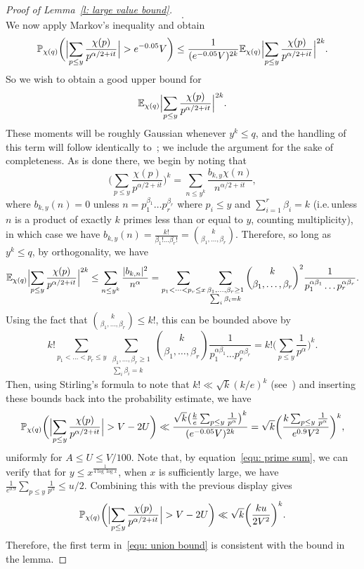 \documentclass[a4paper,12pt,reqno]{amsart}
\newcommand{\E}{\mathbb{E}}
\newcommand{\p}{\mathbb{P}}
\begin{document}
\begin{proof}[Proof of Lemma~\ref{l: large value bound}]
\[. \]
We now apply Markov's inequality and obtain
\[
\p_{\chi(q)} \biggl( \Bigl| \sum_{p \leq y} \frac{\chi (p)}{p^{\alpha / 2 + it}} \Bigr| > e^{-0.05} V \biggr) \leq \frac{1}{(e^{-0.05} V)^{2k}}\E_{\chi (q)} \Bigl| \sum_{p \leq y} \frac{\chi (p)}{p^{\alpha / 2 + it}} \Bigr|^{2k} .
\]
So we wish to obtain a good upper bound for 
\[
\E_{\chi (q)} \Bigl| \sum_{p \leq y} \frac{\chi (p)}{p^{\alpha / 2 + it}} \Bigr|^{2k}.
\]
These moments will be roughly Gaussian whenever $y^k \leq q$, and the handling of this term will follow identically to~\citet[Lemma~3]{SoundMoments}; we include the argument for the sake of completeness. As is done there, we begin by noting that 
\[
\biggl( \sum_{p \leq y} \frac{\chi (p)}{p^{\alpha / 2 + it}} \biggr)^{k} = \sum_{n \leq y^k} \frac{b_{k,y} \chi(n)}{n^{\alpha/2 + it}},
\]
where $b_{k,y} (n) = 0$ unless $n = p_1^{\beta_1} \dots p_r^{\beta_r}$ where $p_i \leq y$ and $\sum_{i=1}^r \beta_i = k$ (i.e.\,unless $n$ is a product of exactly $k$ primes less than or equal to $y$, counting multiplicity), in which case we have $b_{k,y} (n) = \frac{k!}{\beta_1! \dots \beta_r!} = {{k}\choose{\beta_1 , \dots, \beta_r}}$. Therefore, so long as $y^k \leq q$, by orthogonality, we have
\[
\E_{\chi (q)} \Bigl| \sum_{p \leq y} \frac{\chi (p)}{p^{\alpha / 2 + it}} \Bigr|^{2k} \leq \sum_{n \leq y^k} \frac{|b_{k,n}|^2}{n^{\alpha}} = \sum_{p_1 < \dots < p_r \leq x} \sum_{\substack{\beta_1 , \dots, \beta_r \geq 1 \\ \sum_{i} \beta_i = k}} {{k}\choose{\beta_1, \dots, \beta_r}}^2 \frac{1}{p_1^{\alpha \beta_1} \dots p_r^{\alpha \beta_r}}.
\]
Using the fact that ${{k}\choose{\beta_1 , \dots, \beta_r }} \leq k!$, this can be bounded above by
\[
k! \sum_{p_1 < \dots < p_r \leq y} \sum_{\substack{\beta_1, \dots, \beta_r \geq 1 \\ \sum_i \beta_i = k}} {{k}\choose{\beta_1, \dots, \beta_r}} \frac{1}{p_1^{\alpha \beta_1} \dots p_r^{\alpha \beta_r}} 
 = k! \biggl( \sum_{p \leq y} \frac{1}{p^\alpha} \biggr)^k .
\]
Then, using Stirling's formula to note that $k! \ll \sqrt{k} (k/e)^k$ (see~\cite[Equation~(B.26)]{MV2007}) and inserting these bounds back into the probability estimate, we have
\[
\p_{\chi(q)} \biggl( \Bigl| \sum_{p \leq y} \frac{\chi (p)}{p^{\alpha / 2 + it}} \Bigr| > V - 2 U \biggr) \ll \frac{ \sqrt{k} \bigl( \frac{k}{e} \sum_{p \leq y} \frac{1}{p^\alpha} \bigr)^k}{( e^{-0.05} V )^{2k}} = \sqrt{k} \biggl( \frac{k \sum_{p \leq y} \frac{1}{p^\alpha} }{e^{0.9} V^2} \biggr)^{k},
\]
uniformly for $A \leq U \leq V/100$. Note that, by equation~\eqref{equ: prime sum}, we can verify that for $y \leq x^{\frac{1}{4 \log \log x}}$, when $x$ is sufficiently large, we have $ \frac{1}{e^{0.9}} \sum_{p \leq y} \frac{1}{p^{\alpha}} \leq u/2 $. Combining this with the previous display gives
\[
\p_{\chi(q)} \biggl( \Bigl| \sum_{p \leq y} \frac{\chi (p)}{p^{\alpha / 2 + it}} \Bigr| > V - 2 U \biggr) \ll \sqrt{k} \biggl( \frac{ku}{2V^2} \biggr)^k .
\]
Therefore, the first term in~\eqref{equ: union bound} is consistent with the bound in the lemma. 


\end{proof}
\end{document}
